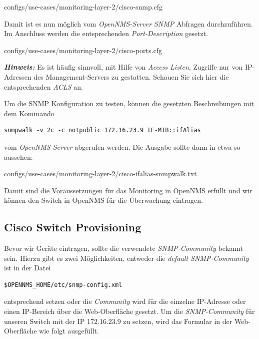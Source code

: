 
  {configs/use-cases/monitoring-layer-2/cisco-snmp.cfg}

Damit ist es nun möglich vom \emph{OpenNMS-Server} \emph{SNMP} Abfragen durchzuführen. Im Anschluss werden die entsprechenden \emph{Port-Description} gesetzt.


  {configs/use-cases/monitoring-layer-2/cisco-ports.cfg}

\textbf{\emph{Hinweis:}} Es ist häufig sinnvoll, mit Hilfe von \emph{Access Listen}, Zugriffe nur von IP-Adressen des Management-Servers zu gestatten. Schauen Sie sich hier die entsprechenden \emph{ACLS} an.

Um die SNMP Konfiguration zu testen, können die gesetzten Beschreibungen mit dem Kommando

\begin{lstlisting}[numbers=none]
snmpwalk -v 2c -c notpublic 172.16.23.9 IF-MIB::ifAlias
\end{lstlisting}

vom \emph{OpenNMS-Server} abgerufen werden. Die Ausgabe sollte dann in etwa so aussehen:


  {configs/use-cases/monitoring-layer-2/cisco-ifalias-snmpwalk.txt}

Damit sind die Voraussetzungen für das Monitoring in OpenNMS erfüllt und wir können den Switch in OpenNMS für die Überwachung eintragen.

\subsection{Cisco Switch Provisioning}
Bevor wir Geräte eintragen, sollte die verwendete \emph{SNMP-Community} bekannt sein. Hierzu gibt es zwei Möglichkeiten, entweder die \emph{default SNMP-Community} ist in der Datei

\begin{lstlisting}[numbers=none]
$OPENNMS_HOME/etc/snmp-config.xml
\end{lstlisting}

entsprechend setzen oder die \emph{Community} wird für die einzelne IP-Adresse oder einen IP-Bereich über die Web-Oberfläche gesetzt. Um die \emph{SNMP-Community} für unseren Switch mit der IP 172.16.23.9 zu setzen, wird das Formular in der Web-Oberfläche wie folgt ausgefüllt.

